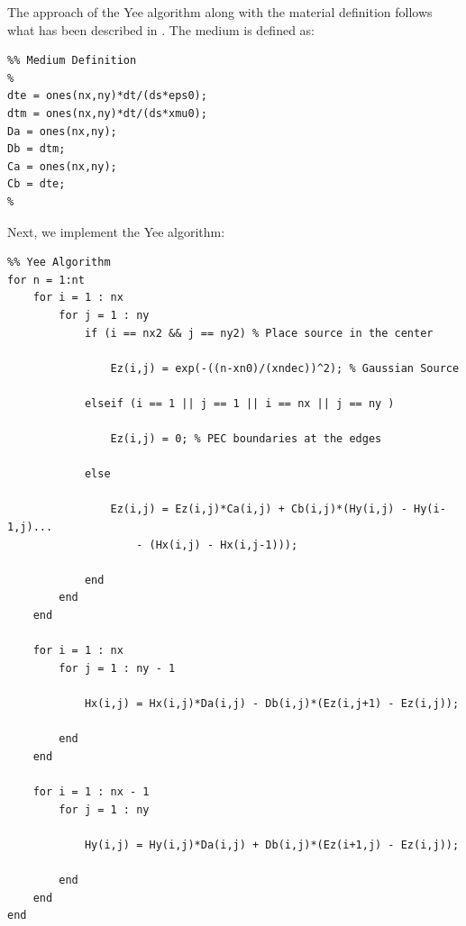 \documentclass[12pt]{article}
\begin{document}
The approach of the Yee algorithm along with the material definition follows what has been described in \cite[pg. 85]{taflove_computational_2005}. The medium is defined as:

\begin{mdframed}[backgroundcolor=gray!20]
  \scriptsize
  \begin{verbatim}
%% Medium Definition
%
dte = ones(nx,ny)*dt/(ds*eps0);
dtm = ones(nx,ny)*dt/(ds*xmu0);
Da = ones(nx,ny);
Db = dtm;
Ca = ones(nx,ny);
Cb = dte;
%
  \end{verbatim}
\end{mdframed}

Next, we implement the Yee algorithm:

\begin{mdframed}[backgroundcolor=gray!20]
  \scriptsize
  \begin{verbatim}
%% Yee Algorithm
for n = 1:nt
    for i = 1 : nx
        for j = 1 : ny
            if (i == nx2 && j == ny2) % Place source in the center
                
                Ez(i,j) = exp(-((n-xn0)/(xndec))^2); % Gaussian Source
                
            elseif (i == 1 || j == 1 || i == nx || j == ny )
                
                Ez(i,j) = 0; % PEC boundaries at the edges
                
            else
                
                Ez(i,j) = Ez(i,j)*Ca(i,j) + Cb(i,j)*(Hy(i,j) - Hy(i-1,j)...
                    - (Hx(i,j) - Hx(i,j-1)));
                
            end
        end
    end
    
    for i = 1 : nx
        for j = 1 : ny - 1
            
            Hx(i,j) = Hx(i,j)*Da(i,j) - Db(i,j)*(Ez(i,j+1) - Ez(i,j));
            
        end
    end
    
    for i = 1 : nx - 1
        for j = 1 : ny
            
            Hy(i,j) = Hy(i,j)*Da(i,j) + Db(i,j)*(Ez(i+1,j) - Ez(i,j));
            
        end
    end
end
  \end{verbatim}
\end{mdframed}
\end{document}
